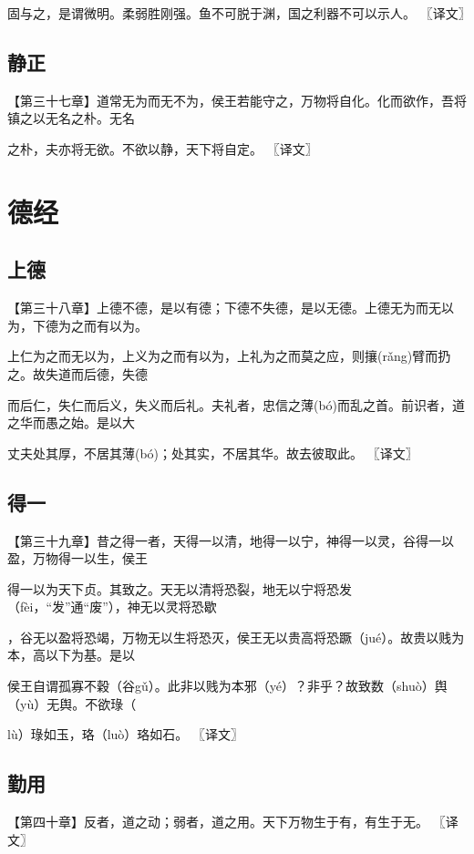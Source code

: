 \documentclass[a4paper,12pt,UTF8,twoside]{ctexbook}
\begin{document}
	固与之，是谓微明。柔弱胜刚强。鱼不可脱于渊，国之利器不可以示人。 〖译文〗
	\chapter{静正}
	
		
	
	
	
	
	
	
	
	
	【第三十七章】道常无为而无不为，侯王若能守之，万物将自化。化而欲作，吾将镇之以无名之朴。无名
	
	之朴，夫亦将无欲。不欲以静，天下将自定。 〖译文〗
	
	
	
	
	
	
	\part{德经}
	
	\chapter{上德}
	【第三十八章】上德不德，是以有德；下德不失德，是以无德。上德无为而无以为，下德为之而有以为。
	
	上仁为之而无以为，上义为之而有以为，上礼为之而莫之应，则攘(rǎng)臂而扔之。故失道而后德，失德
	
	而后仁，失仁而后义，失义而后礼。夫礼者，忠信之薄(bó)而乱之首。前识者，道之华而愚之始。是以大
	
	丈夫处其厚，不居其薄(bó)；处其实，不居其华。故去彼取此。 〖译文〗
	
	
	
	
	\chapter{得一}
	【第三十九章】昔之得一者，天得一以清，地得一以宁，神得一以灵，谷得一以盈，万物得一以生，侯王
	
	得一以为天下贞。其致之。天无以清将恐裂，地无以宁将恐发（fèi，“发”通“废”），神无以灵将恐歇
	
	，谷无以盈将恐竭，万物无以生将恐灭，侯王无以贵高将恐蹶（jué）。故贵以贱为本，高以下为基。是以
	
	侯王自谓孤寡不穀（谷gǔ）。此非以贱为本邪（yé）？非乎？故致数（shuò）舆（yù）无舆。不欲琭（
	
	lù）琭如玉，珞（luò）珞如石。 〖译文〗
	
	
	

	\chapter{勤用}
		【第四十章】反者，道之动；弱者，道之用。天下万物生于有，有生于无。 〖译文〗
	
\end{document}
